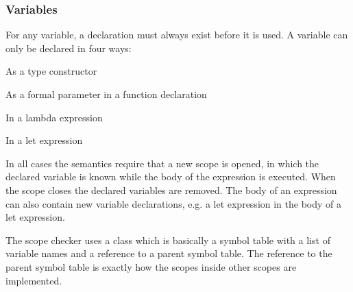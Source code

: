 

\subsubsection{Variables}
For any variable, a declaration must always exist before it is used. A variable
can only be declared in four ways:

\begin{nlist}
  \item As a type constructor
  \item As a formal parameter in a function declaration
  \item In a lambda expression
  \item In a let expression
\end{nlist}

In all cases the \productname{} semantics require that a new scope is opened, in
which the declared variable is known while the body of the expression is
executed. When the scope closes the declared variables are removed. The body of
an expression can also contain new variable declarations, e.g. a let
expression in the body of a let expression. 

The scope checker uses a  class which is basically a
symbol table with a list of variable names and a reference to a parent symbol
table.  The reference to the parent symbol table is exactly how the scopes
inside other scopes are implemented. 


